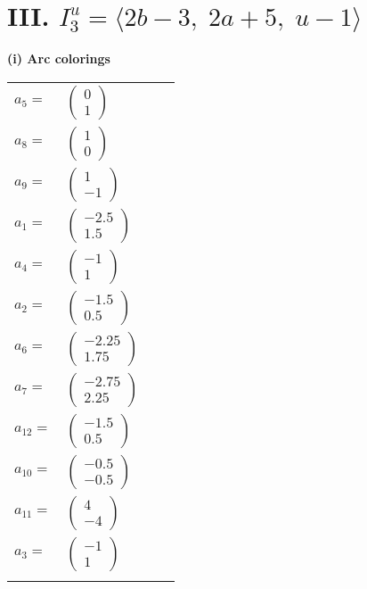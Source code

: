 \documentclass[1p]{elsarticle_modified}
\theoremstyle{definition}
\begin{document}
\centering \section*{III. $I^u_{3}= \langle 2 b-3,\;2 a+5,\;u-1 \rangle$}
\flushleft \textbf{(i) Arc colorings}\\
\begin{tabular}{m{7pt} m{180pt} m{7pt} m{180pt} }
\flushright $a_{5}=$&$\begin{pmatrix}0\\1\end{pmatrix}$ \\
\flushright $a_{8}=$&$\begin{pmatrix}1\\0\end{pmatrix}$ \\
\flushright $a_{9}=$&$\begin{pmatrix}1\\-1\end{pmatrix}$ \\
\flushright $a_{1}=$&$\begin{pmatrix}-2.5\\1.5\end{pmatrix}$ \\
\flushright $a_{4}=$&$\begin{pmatrix}-1\\1\end{pmatrix}$ \\
\flushright $a_{2}=$&$\begin{pmatrix}-1.5\\0.5\end{pmatrix}$ \\
\flushright $a_{6}=$&$\begin{pmatrix}-2.25\\1.75\end{pmatrix}$ \\
\flushright $a_{7}=$&$\begin{pmatrix}-2.75\\2.25\end{pmatrix}$ \\
\flushright $a_{12}=$&$\begin{pmatrix}-1.5\\0.5\end{pmatrix}$ \\
\flushright $a_{10}=$&$\begin{pmatrix}-0.5\\-0.5\end{pmatrix}$ \\
\flushright $a_{11}=$&$\begin{pmatrix}4\\-4\end{pmatrix}$ \\
\flushright $a_{3}=$&$\begin{pmatrix}-1\\1\end{pmatrix}$\\&\end{tabular}
\end{document}
